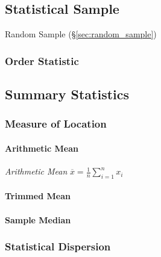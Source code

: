 \subsection{Statistical Sample}\label{sec:statistical_sample}

Random Sample (\S\ref{sec:random_sample})



\subsubsection{Order Statistic}\label{sec:order_statistic}



\subsection{Summary Statistics}\label{sec:summary_statistics}

\subsubsection{Measure of Location}\label{sec:location_measure}

\paragraph{Arithmetic Mean}\label{sec:arithmetic_mean}\hfill

\emph{Arithmetic Mean} $\overline{x} = \frac{1}{n}\sum_{i=1}^n x_i$



\paragraph{Trimmed Mean}\label{sec:trimmed_mean}\hfill

\paragraph{Sample Median}\label{sec:median}\hfill



\subsubsection{Statistical Dispersion}\label{sec:statistical_dispersion}

